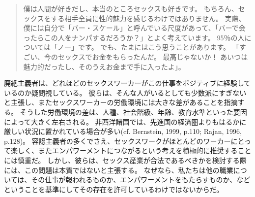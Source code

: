 \documentclass[paper=a4,book,openany]{jlreq} \usepackage{mystyle}
\begin{document}
\begin{quote}
僕は人間が好きだし、本当のところセックスも好きです。
もちろん、セックスをする相手全員に性的魅力を感じるわけではありません。
実際、僕には自分で「バー・スケール」と呼んでいる尺度があって、「バーで会ったらこの人をナンパするだろうか？」とよく考えています。
95％の人については「ノー」です。
でも、たまにはこう思うことがあります。
「すごい、今のセックスでお金をもらったんだ。
最高じゃないか！ あいつは魅力的だったし、そのうえお金まで手に入ったよ」。
\citep[p.11]{curtis19:_we_are_naked_waitr_who_deliv_sex}
\end{quote}

廃絶主義者は、どれほどのセックスワーカーがこの仕事をポジティブに経験しているのか疑問視している。
彼らは、そんな人がいるとしても少数派にすぎないと主張し、またセックスワーカーの労働環境には大きな差があることを指摘する。
そうした労働環境の差は、人種、社会階級、年齢、教育水準といった要因によって大きく左右される。
非西洋諸国では、先進国の経済圏よりもはるかに厳しい状況に置かれている場合が多い(cf. Bernstein, 1999, p.110; Rajan, 1996, p.128)。
\nocite{bernstein99:_whats_wrong_prost}\nocite{rajan96:_prost_quest}
容認主義者の多くでさえ、セックスワークがほとんどのワーカーにとって楽しく、またエンパワーメントにつながるという考えを積極的に推奨することには慎重だ。
しかし、彼らは、セックス産業が合法であるべきかを検討する際には、この問題は本質ではないと主張する。
なぜなら、私たちは他の職業については、その仕事が報われるものか、エンパワーメントをもたらすものか、などということを基準にしてその存在を許可しているわけではないからだ。
\end{document}
